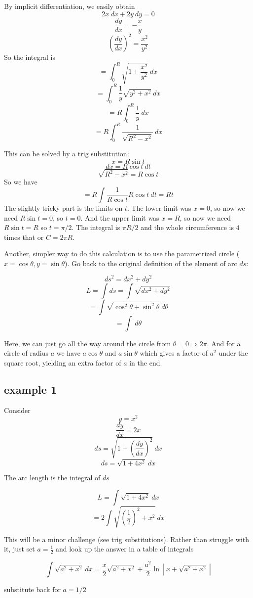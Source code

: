 \documentclass[11pt, oneside]{article}   	%
\begin{document}
By implicit differentiation, we easily obtain
\[ 2x \ dx + 2y \ dy = 0 \]
\[ \frac{dy}{dx} = -\frac{x}{y} \]
\[ (\frac{dy}{dx})^2 = \frac{x^2}{y^2} \]
So the integral is
\[ = \int_0^R  \sqrt{1 + \frac{x^2}{y^2}} \ dx \]
\[ = \int_0^R \frac{1}{y}  \sqrt{y^2 + x^2} \ dx \]
\[ = R \int_0^R \frac{1}{y}  \ dx \]
\[ = R \int_0^R \frac{1}{\sqrt{R^2-x^2}}  \ dx \]

This can be solved by a trig substitution:
\[ x = R \sin t \]
\[ dx = R \cos t \ dt \]
\[ \sqrt{R^2 - x^2} = R \cos t \]
So we have
\[ = R \int \frac{1}{R \cos t} R \cos t \ dt = R t \]
The slightly tricky part is the limits on $t$.  The lower limit was $x=0$, so now we need $R \sin t = 0$, so $t=0$.  And the upper limit was $x=R$, so now we need $R \sin t = R$ so $t = \pi/2$.  The integral is $\pi R/2$ and the whole circumference is $4$ times that or $C = 2 \pi R$.

Another, simpler way to do this calculation is to use the parametrized circle ($x = \cos \theta, y = \sin \theta$).  Go back to the original definition of the element of arc $ds$:

\[ ds^2 = dx^2 + dy^2 \]
\[ L = \int ds = \int \sqrt{dx^2 + dy^2} \]
\[ = \int \sqrt{\cos^2 \theta + \sin^2 \theta} \ d \theta \]
\[ = \int \ d \theta \]

Here, we can just go all the way around the circle from $\theta = 0 \Rightarrow 2 \pi$.  And for a circle of radius $a$ we have $a \cos \theta$ and $a \sin \theta$ which gives a factor of $a^2$ under the square root, yielding an extra factor of $a$ in the end.

\subsection*{example 1}
Consider
\[ y = x^2 \]
\[ \frac{dy}{dx} = 2x \]
\[ ds = \sqrt{1 + (\frac{dy}{dx})^2} \ dx \]
\[ ds =  \sqrt{1 + 4x^2} \ dx \]

The arc length is the integral of $ds$

\[ L = \int  \sqrt{1 + 4x^2} \ dx \]
\[ = 2 \int  \sqrt{(\frac{1}{2})^2 + x^2} \ dx \]

This will be a minor challenge (see trig substitutions).  Rather than struggle with it, just set $a = \frac{1}{2}$ and look up the answer in a table of integrals

\[ \int  \sqrt{a^2 + x^2} \ dx  = \frac{x}{2}\sqrt{a^2 + x^2} + \frac{a^2}{2} \ln \ | \ x + \sqrt{a^2 + x^2} \ | \]

substitute back for $a = 1/2$
\end{document}
